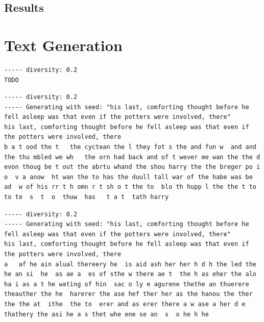 \documentclass{article}[]
\begin{document}
\subsection{Results}




\appendix
\section{Text Generation}
\begin{lstlisting}[label=nietzsche-low-diverse, caption={Nietzsche after 60 epochs}]
----- diversity: 0.2
TODO
\end{lstlisting}

\begin{lstlisting}[label=lstm-harry-all-low-diverse, caption={LSTM Harry Potter after 60 epochs, diversity=0.2}]
----- diversity: 0.2
----- Generating with seed: "his last, comforting thought before he fell asleep was that even if the potters were involved, there"
his last, comforting thought before he fell asleep was that even if the potters were involved, there
b a t ood the t   the cyctean the l they fot s the and fun w  and and the thu mbled we wh   the orn had back and of t wever me wan the the d evon thoug be t out the abrtu whand the shou harry the the breger po i o  v a anow  ht wan the to has the duull tall war of the habe was be ad  w of his rr t h omn r t sh o t the to  blo th hupp l the the t to to te  s  t  o  thuw  has   t a t  tath harry
\end{lstlisting}

\begin{lstlisting}[label=gru-harry-all-low-diverse, caption={GRU Harry Potter after 60 epochs, diversity=0.2}]
----- diversity: 0.2
----- Generating with seed: "his last, comforting thought before he fell asleep was that even if the potters were involved, there"
his last, comforting thought before he fell asleep was that even if the potters were involved, there
a   af he ain alual thereery he  is aid ash her her h d h the led the he an si  he  as ae a  es of sthe w there ae t  the h as eher the alo ha i as a t he wating of hin  sac o ly e agurene thethe an thuerere theauther the he  harerer the ase hef ther her as the hanou the ther the the at  ithe  the to  erer and as erer there a w ase a her d e thathery the asi he a s thet whe ene se an  s  o he h he
\end{lstlisting}


 

\end{document}

